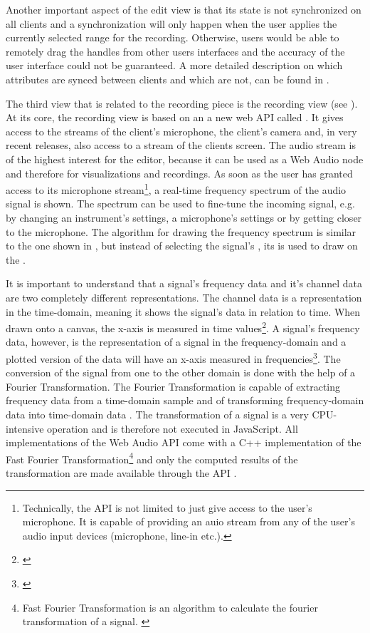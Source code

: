 Another important aspect of the edit view is that its state is not synchronized on all clients and a synchronization will only happen when the user applies the currently selected range for the recording. Otherwise, users would be able to remotely drag the handles from other users interfaces and the accuracy of the user interface could not be guaranteed. A more detailed description on which attributes are synced between clients and which are not, can be found in .


The third view that is related to the recording piece is the recording view (see ). At its core, the recording view is based on an a new web API called . It gives access to the streams of the client's microphone, the client's camera and, in very recent releases, also access to a stream of the clients screen. The audio stream is of the highest interest for the editor, because it can be used as a Web Audio node and therefore for visualizations and recordings. As soon as the user has granted access to its microphone stream\footnote{Technically, the API is not limited to just give access to the user's microphone. It is capable of providing an auio stream from any of the user's audio input devices (microphone, line-in etc.).}, a real-time frequency spectrum of the audio signal is shown. The spectrum can be used to fine-tune the incoming signal, e.g. by changing an instrument's settings, a microphone's settings or by getting closer to the microphone. The algorithm for drawing the frequency spectrum is similar to the one shown in , but instead of selecting the signal's , its  is used to draw on the .

It is important to understand that a signal's frequency data and it's channel data are two completely different representations. The channel data is a representation in the time-domain, meaning it shows the signal's data in relation to time. When drawn onto a canvas, the x-axis is measured in time values\footnote{\cite[p. 40f]{park2009introductionto}}. A signal's frequency data, however, is the representation of a signal in the frequency-domain and a plotted version of the data will have an x-axis measured in frequencies\footnote{\cite[p. 276f]{park2009introductionto}}. The conversion of the signal from one to the other domain is done with the help of a Fourier Transformation. The Fourier Transformation is capable of extracting frequency data from a time-domain sample and of transforming frequency-domain data into time-domain data \cite{riffle2011fourier}. The transformation of a signal is a very CPU-intensive operation and is therefore not executed in JavaScript. All implementations of the Web Audio API come with a C++ implementation of the Fast Fourier Transformation\footnote{Fast Fourier Transformation is an algorithm to calculate the fourier transformation of a signal. \cite[p. 319f]{park2009introductionto}} and only the computed results of the transformation are made available through the API \cite[chapter: 7.6.5]{wilson2014webaudiospec}.

